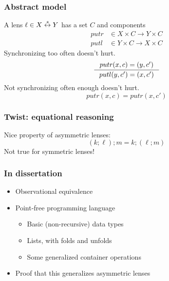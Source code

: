 \documentclass[14pt]{beamer}
\begin{document}
\begin{frame}
    \frametitle{Abstract model}
    A lens $\ell \in X \stackrel s\leftrightarrow Y$ has a set $C$ and components
    \begin{align*}
        putr &\in X\times C \to Y\times C \\
        putl &\in Y\times C \to X\times C
    \end{align*}
    \pause
    Synchronizing too often doesn't hurt.
    \[\inference{putr(x,c)=(y,c')}{putl(y,c')=(x,c')}\]
    \pause
    \color{gray}Not synchronizing often enough doesn't hurt.
    \[putr(x,c)=putr(x,c')\]
\end{frame}

\begin{frame}
    \frametitle{Twist: equational reasoning}
    \begin{center}
    \end{center}
    Nice property of asymmetric lenses:
    \[(k;\ell);m = k;(\ell;m)\]
    \pause
    \alert{Not true for symmetric lenses!}
\end{frame}

\begin{frame}
    \frametitle{In dissertation}
    \begin{itemize}
        \item Observational equivalence
        \item Point-free programming language
            \begin{itemize}
                \item Basic (non-recursive) data types
                \item Lists, with folds and unfolds
                \item Some generalized container operations
            \end{itemize}
        \item Proof that this generalizes asymmetric lenses
    \end{itemize}
\end{frame}
\end{document}
